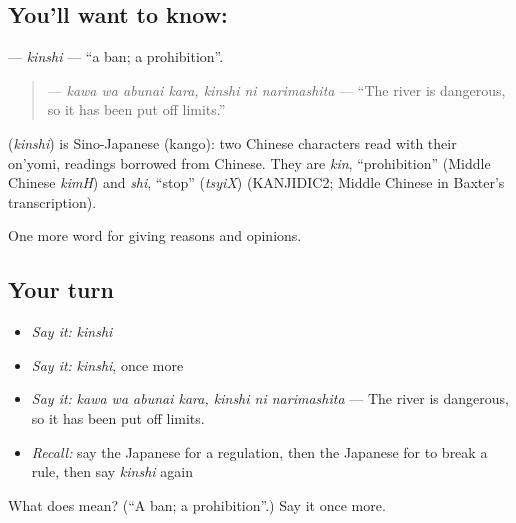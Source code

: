 \subsection*{You'll want to know: }
\textbf{} — \emph{kinshi} — \textquotedblleft{}a ban; a prohibition\textquotedblright{}.

\begin{quote}
\textbf{  } — \emph{kawa wa abunai kara, kinshi ni narimashita} — \textquotedblleft{}The river is dangerous, so it has been put off limits.\textquotedblright{}
\end{quote}

\begin{cousinweb}
\textbf{} (\emph{kinshi}) is Sino-Japanese (kango): two Chinese characters read with their on'yomi, readings borrowed from Chinese. They are \emph{kin}, \textquotedblleft{}prohibition\textquotedblright{} (Middle Chinese \emph{kimH}) and \emph{shi}, \textquotedblleft{}stop\textquotedblright{} (\emph{tsyiX}) (KANJIDIC2; Middle Chinese in Baxter's transcription).
\end{cousinweb}

\begin{grammarlens}[title={What you've built}]
One more word for giving reasons and opinions.
\end{grammarlens}

\subsection*{Your turn}
\begin{itemize}
\raggedright
  \item \emph{Say it:} \emph{kinshi}
  \item \emph{Say it:} \emph{kinshi}, once more
  \item \emph{Say it:} \emph{kawa wa abunai kara, kinshi ni narimashita} — The river is dangerous, so it has been put off limits.
  \item \emph{Recall:} say the Japanese for a regulation, then the Japanese for to break a rule, then say \emph{kinshi} again
\end{itemize}

\begin{tcolorbox}[breakable,colback=teal!4,colframe=teal!35!black,title={Before you move on}]
What does  mean? (\textquotedblleft{}A ban; a prohibition\textquotedblright{}.) Say it once more.
\end{tcolorbox}
